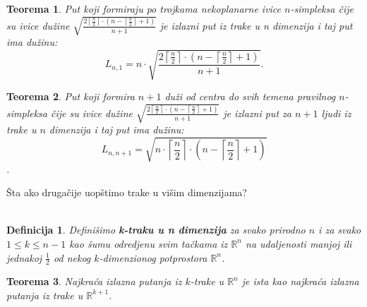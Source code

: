 \documentclass[b1paper,portrait]{template/baposter}
\newtheorem{theorem}{Teorema}
\newtheorem*{definition}{Definicija}
\begin{document}
\begin{poster}
{ 	\begin{theorem} Put koji formiraju po trojkama nekoplanarne ivice $n$-simpleksa \v cije su ivice du\v zine 
 		$\sqrt{\frac{2\left\lceil \frac{n}{2}\right\rceil\cdot \left( n-\left\lceil\frac{n}{2}\right\rceil+1\right)}{n+1}}$
 		je izlazni put iz trake u n dimenzija i taj put ima du\v zinu:
		$$L_{n,1}=n\cdot \sqrt{\frac{2\left\lceil \frac{n}{2}\right\rceil\cdot \left( n-\left\lceil\frac{n}{2}\right\rceil+1\right)}{n+1}}.$$
	\end{theorem}
	\begin{theorem}
 		Put koji formira $n+1$ du\v zi od centra do svih temena pravilnog $n$-simpleksa  \v cije su ivice du\v zine
 		$\sqrt{\frac{2\left\lceil \frac{n}{2}\right\rceil\cdot \left( n-\left\lceil\frac{n}{2}\right\rceil+1\right)}{n+1}}$
 		je izlazni put za $n+1$ ljudi iz trake u $n$ dimenzija i taj put ima du\v zinu:
		$$L_{n,n+1}=\sqrt{n\cdot\left\lceil\frac{n}{2}\right\rceil\cdot\left( n-\left\lceil\frac{n}{2}\right\rceil+1\right)}$$.
 	\end{theorem}
	 \vspace{0.15cm}
}



{
	\v Sta ako druga\v cije uop\v stimo trake u vi\v sim dimenzijama? \\ \\
	\begin{definition}
		Defini\v simo \textbf{k-traku u n dimenzija} za svako prirodno $n$ i za svako $1\leqslant k\leqslant n-1$  kao \v sumu odredjenu
		svim ta\v ckama iz $\mathbb{R}^n$ na udaljenosti manjoj ili jednakoj $\frac{1}{2}$ od nekog $k$-dimenzionog potprostora $\mathbb{R}^n$. 
	\end{definition}
	\begin{theorem}
		Najkra\' ca izlazna putanja iz $k$-trake u $\mathbb{R}^n$ je ista kao najkra\' ca izlazna putanja iz trake u $\mathbb{R}^{k+1}$.
	\end{theorem}
	\vspace{0.15cm}
}



\end{poster}
\end{document}
